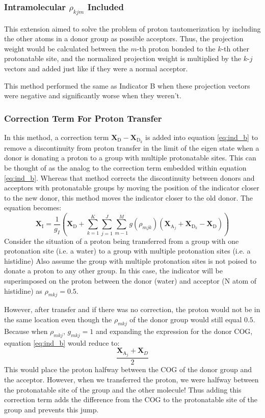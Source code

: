 \documentclass{article}
\newcommand{\mb}[1]{\mathbf{#1}}
\newcommand{\mr}[1]{\mathrm{#1}}
\begin{document}
\subsubsection{Intramolecular $\rho_{kjm}$ Included}\label{ss:indicator7}
This extension aimed to solve the problem of proton tautomerization by including the other atoms in a donor group as possible acceptors.
Thus, the projection weight would be calculated between the $m$-th proton bonded to the $k$-th other protonatable site, and the normalized projection weight is multiplied by the $k$-$j$ vectors and added just like if they were a normal acceptor.

This method performed the same as Indicator B when these projection vectors were negative and significantly worse when they weren't.

\subsubsection{Correction Term For Proton Transfer}\label{ss:indicator11}
In this method, a correction term $\mathbf{X}_\mr{D} - \mathbf{X}_{\mr{D}_k}$ is added into equation \ref{eq:ind_b} to remove a discontinuity from proton transfer in the limit of the eigen state when a donor is donating a proton to a group with multiple protonatable sites.
This can be thought of as the analog to the correction term embedded within equation \ref{eq:ind_b}.
Whereas that method corrects the discontinuity between donors and acceptors with protonatable groups by moving the position of the indicator closer to the new donor, this method moves the indicator closer to the old donor.
The equation becomes:
\begin{equation}\label{eq:ind_b_with_correction}
\mathbf{X}_\mr{I} = \frac{1}{g_I} \left( \mathbf{X}_\mr{D} + \sum^K_{k=1} \sum^J_{j=1}   \sum^M_{m-1} g(\rho_{mjk}) \left(\mathbf{X}_{\mr{A}_j} + \mathbf{X}_{\mr{D}_k} - \mathbf{X}_\mr{D}  \right) \right) 
\end{equation}
Consider the situation of a proton being transferred from a group with one protonation site (i.e. a water) to a group with multiple protonation sites (i.e. a histidine)
Also assume the group with multiple protonation sites is not poised to donate a proton to any other group.
In this case, the indicator will be superimposed on the proton between the donor (water) and acceptor (N atom of histidine) as $\rho_{mkj} = 0.5$.

However, after transfer and if there was no correction, the proton would not be in the same location even though the $\rho_{mkj}$ of the donor group would still equal $0.5$.
Because when $\rho_{mkj}$, $g_{mkj} = 1$ and expanding the expression for the donor COG, equation \ref{eq:ind_b} would reduce to:
\begin{equation}
\frac{\mb{X}_{\mr{A}_j} + \mb{X}_D}{2}
\end{equation}
This would place the proton halfway between the COG of the donor group and the acceptor.
However, when we transferred the proton, we were halfway between the protonatable site of the group and the other molecule!
Thus adding this correction term adds the difference from the COG to the protonatable site of the group and prevents this jump.
\end{document}
